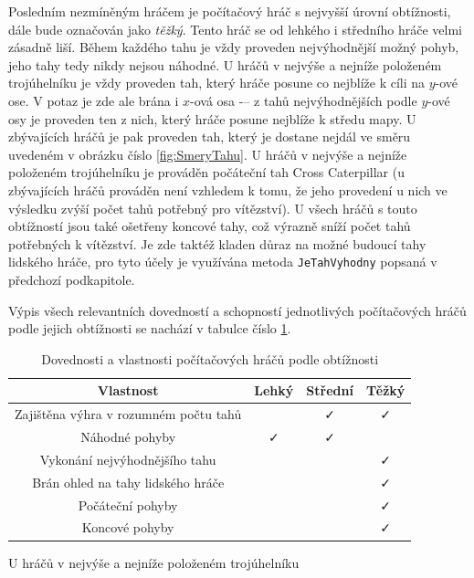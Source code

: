 Posledním nezmíněným hráčem je počítačový hráč s nejvyšší úrovní obtížnosti, dále bude označován jako \emph{těžký}. Tento hráč se od lehkého i středního hráče velmi zásadně liší. Během každého tahu je vždy proveden nejvýhodnější možný pohyb, jeho tahy tedy nikdy nejsou náhodné. U hráčů v nejvýše a nejníže položeném trojúhelníku je vždy proveden tah, který hráče posune co nejblíže k cíli na $y$-ové ose. V potaz je zde ale brána i $x$-ová osa -– z tahů nejvýhodnějších podle $y$-ové osy je proveden ten z nich, který hráče posune nejblíže k středu mapy. U zbývajících hráčů je pak proveden tah, který je dostane nejdál ve směru uvedeném v obrázku číslo \ref{fig:SmeryTahu}. U hráčů v nejvýše a nejníže položeném trojúhelníku je prováděn počáteční tah Cross Caterpillar (u zbývajících hráčů prováděn není vzhledem k tomu, že jeho provedení u nich ve výsledku zvýší počet tahů potřebný pro vítězství). U všech hráčů s touto obtížností jsou také ošetřeny koncové tahy, což výrazně sníží počet tahů potřebných k vítězství. Je zde taktéž kladen důraz na možné budoucí tahy lidského hráče, pro tyto účely je využívána metoda \lstinline$JeTahVyhodny$ popsaná v předchozí podkapitole.

Výpis všech relevantních dovedností a schopností jednotlivých počítačových hráčů podle jejich obtížnosti se nachází v tabulce číslo \ref{tab:ObtiznostiPocitacovychHracu}.

\begin{table}
	\centering
	\caption{Dovednosti a vlastnosti počítačových hráčů podle obtížnosti}
	\label{tab:ObtiznostiPocitacovychHracu}
	\begin{tabular}{cccc}
		\toprule
		Vlastnost & \multicolumn{1}{c}{Lehký} & \multicolumn{1}{c}{Střední} & \multicolumn{1}{c}{Těžký}\\
		\midrule
		Zajištěna výhra v rozumném počtu tahů & \faTimes & \faCheck & \faCheck\\
		Náhodné pohyby & \faCheck & \faCheck & \faTimes\\
		Vykonání nejvýhodnějšího tahu & \faTimes & \faTimes & \faCheck\\
		Brán ohled na tahy lidského hráče & \faTimes & \faTimes & \faCheck\\
		Počáteční pohyby & \faTimes & \faTimes & \faCheck*\\
		Koncové pohyby & \faTimes & \faTimes & \faCheck\\
		\bottomrule
	\end{tabular}
	\begin{tablenotes}
      \small
      \item *U hráčů v nejvýše a nejníže položeném trojúhelníku
    \end{tablenotes}
\end{table}

